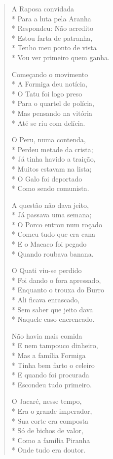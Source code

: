 \begin{verse}
A Raposa convidada\\*
Para a luta pela Aranha\\*
Respondeu: Não acredito\\*
Estou farta de patranha,\\*
Tenho meu ponto de vista\\*
Vou ver primeiro quem ganha.

Começando o movimento\\*
A Formiga deu notícia,\\*
O Tatu foi logo preso\\*
Para o quartel de polícia,\\*
Mas pensando na vitória\\*
Até se riu com delícia.

O Peru, numa contenda,\\*
Perdeu metade da crista;\\*
Já tinha havido a traição,\\*
Muitos estavam na lista;\\*
O Galo foi deportado\\*
Como sendo comunista.

A questão não dava jeito,\\*
Já passava uma semana;\\*
O Porco entrou num roçado\\*
Comeu tudo que era cana\\*
E o Macaco foi pegado\\*
Quando roubava banana.

O Quati viu-se perdido\\*
Foi dando o fora apressado,\\*
Enquanto o trouxa do Burro\\*
Ali ficava enrascado,\\*
Sem saber que jeito dava\\*
Naquele caso encrencado.

Não havia mais comida\\*
E nem tampouco dinheiro,\\*
Mas a família Formiga\\*
Tinha bem farto o celeiro\\*
E quando foi procurada\\*
Escondeu tudo primeiro.

O Jacaré, nesse tempo,\\*
Era o grande imperador,\\*
Sua corte era composta\\*
Só de bichos de valor,\\*
Como a família Piranha\\*
Onde tudo era doutor.


\end{verse}
